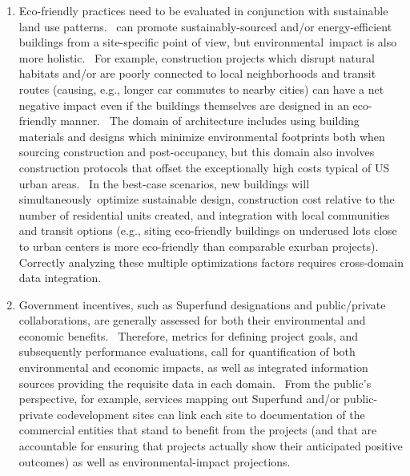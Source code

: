 \documentclass[10.5pt]{article}
\begin{document}
{{\begin{enumerate}[leftmargin=3pt]
\item{} Eco-friendly \AEC{} practices need to be evaluated in conjunction with sustainable land use patterns.   \AEC{} can promote sustainably-sourced and/or energy-efficient buildings from a site-specific point of view, but \AEC{} environmental impact is also more holistic.  For example, construction projects which disrupt natural habitats and/or are poorly connected to local neighborhoods and transit routes (causing, e.g., longer car commutes to nearby cities) can have a net negative impact even if the buildings themselves are designed in an eco-friendly manner.  The domain of  architecture includes using building materials and designs which minimize environmental footprints both when sourcing construction and post-occupancy, but this domain also involves construction protocols that offset the exceptionally high \AEC{} costs typical of US urban areas.  In the best-case scenarios, new buildings will simultaneously optimize sustainable design, construction cost relative to the number of residential units created, and integration with local communities and transit options (e.g., siting eco-friendly buildings on underused lots close to urban centers is more eco-friendly than comparable exurban projects).  Correctly analyzing these multiple optimizations factors requires cross-domain data integration.

\item{} Government incentives, such as Superfund designations and public/private collaborations, are generally assessed for both their environmental and economic benefits.  Therefore, metrics for defining project goals, and subsequently performance evaluations, call for quantification of both environmental and economic impacts, as well as integrated information sources providing the requisite data in each domain.  From the public's perspective, for example, \GIS{} services mapping out Superfund and/or public-private codevelopment sites can link each site to documentation of the commercial entities that stand to benefit from the projects (and that are accountable for ensuring that projects actually show their anticipated positive outcomes) as well as environmental-impact projections. 
\end{enumerate}
}

\vspace*{-1em}


}
\end{document}
